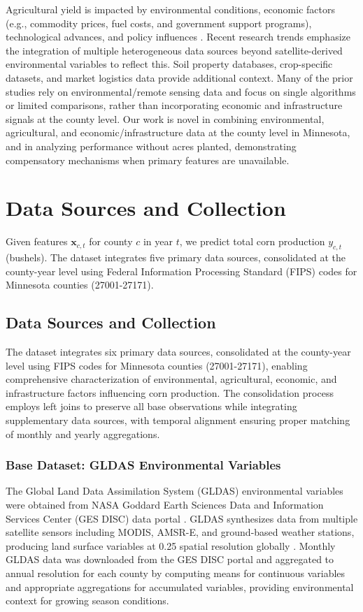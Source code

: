 \documentclass[twocolumn]{article}
\begin{document}
Agricultural yield is impacted by environmental conditions, economic factors (e.g., commodity prices, fuel costs, and government support programs), technological advances, and policy influences \cite{desloires2024, ji2022}. Recent research trends emphasize the integration of multiple heterogeneous data sources beyond satellite-derived environmental variables to reflect this. Soil property databases, crop-specific datasets, and market logistics data provide additional context. Many of the prior studies rely on environmental/remote sensing data and focus on single algorithms or limited comparisons, rather than incorporating economic and infrastructure signals at the county level. Our work is novel in combining environmental, agricultural, and economic/infrastructure data at the county level in Minnesota, and in analyzing performance without acres planted, demonstrating compensatory mechanisms when primary features are unavailable.

\section{Data Sources and Collection}

Given features $\mathbf{x}_{c,t}$ for county $c$ in year $t$, we predict total corn production $y_{c,t}$ (bushels). The dataset integrates five primary data sources, consolidated at the county-year level using Federal Information Processing Standard (FIPS) codes for Minnesota counties (27001-27171).

\subsection{Data Sources and Collection}

The dataset integrates six primary data sources, consolidated at the county-year level using FIPS codes for Minnesota counties (27001-27171), enabling comprehensive characterization of environmental, agricultural, economic, and infrastructure factors influencing corn production. The consolidation process employs left joins to preserve all base observations while integrating supplementary data sources, with temporal alignment ensuring proper matching of monthly and yearly aggregations.

\subsubsection{Base Dataset: GLDAS Environmental Variables}
The Global Land Data Assimilation System (GLDAS) environmental variables were obtained from NASA Goddard Earth Sciences Data and Information Services Center (GES DISC) data portal \cite{nasa_gldas}. GLDAS synthesizes data from multiple satellite sensors including MODIS, AMSR-E, and ground-based weather stations, producing land surface variables at 0.25\textdegree{} spatial resolution globally \cite{rodell2004}. Monthly GLDAS data was downloaded from the GES DISC portal and aggregated to annual resolution for each county by computing means for continuous variables and appropriate aggregations for accumulated variables, providing environmental context for growing season conditions.
\end{document}
